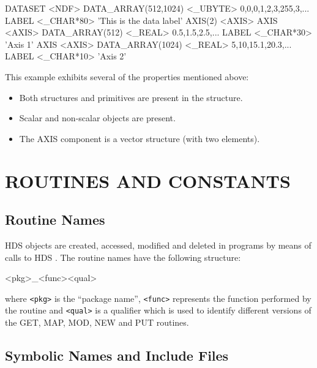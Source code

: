 \documentclass[twoside,11pt]{starlink}
\providecommand{\qt}[1]{``#1''}
\begin{document}
\begin{small}
\begin{terminalv}
DATASET <NDF>
   DATA_ARRAY(512,1024)    <_UBYTE>   0,0,0,1,2,3,255,3,...
   LABEL                   <_CHAR*80> 'This is the data label'
   AXIS(2) <AXIS>
      AXIS <AXIS>
         DATA_ARRAY(512)   <_REAL>    0.5,1.5,2.5,...
         LABEL             <_CHAR*30> 'Axis 1'
      AXIS <AXIS>
         DATA_ARRAY(1024)  <_REAL>    5,10,15.1,20.3,...
         LABEL             <_CHAR*10> 'Axis 2'
\end{terminalv}
\end{small}

This example exhibits several of the properties mentioned above:

\begin{itemize}
\item Both structures and primitives are present in the structure.
\item Scalar and non-scalar objects are present.
\item The AXIS component is a vector structure (with two elements).
\end{itemize}

\section{ROUTINES AND CONSTANTS}

\subsection{Routine Names}

HDS objects are created, accessed, modified and deleted in programs by
means of calls to HDS . The
routine names have the following structure:

\begin{small}
\begin{terminalv}
<pkg>_<func><qual>
\end{terminalv}
\end{small}

where \verb+<pkg>+ is the \qt{package name}, \verb+<func>+ represents
the function performed by the routine and \verb+<qual>+ is a qualifier
which is used to identify different versions of the GET, MAP, MOD, NEW
and PUT routines.

\subsection{Symbolic Names and Include Files}
\end{document}
